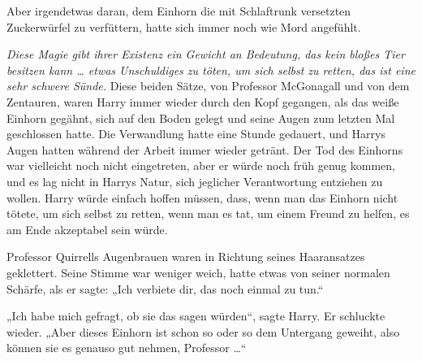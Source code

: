 Aber irgendetwas daran, dem Einhorn die mit Schlaftrunk versetzten Zuckerwürfel zu verfüttern, hatte sich immer noch wie Mord angefühlt.

\emph{Diese Magie gibt ihrer Existenz ein Gewicht an Bedeutung, das kein bloßes Tier besitzen kann … etwas Unschuldiges zu töten, um sich selbst zu retten, das ist eine sehr schwere Sünde.}
Diese beiden Sätze, von Professor McGonagall und von dem Zentauren, waren Harry immer wieder durch den Kopf gegangen, als das weiße Einhorn gegähnt, sich auf den Boden gelegt und seine Augen zum letzten Mal geschlossen hatte. Die Verwandlung hatte eine Stunde gedauert, und Harrys Augen hatten während der Arbeit immer wieder getränt. Der Tod des Einhorns war vielleicht noch nicht eingetreten, aber er würde noch früh genug kommen, und es lag nicht in Harrys Natur, sich jeglicher Verantwortung entziehen zu wollen. Harry würde einfach hoffen müssen, dass, wenn man das Einhorn nicht tötete, um sich selbst zu retten, wenn man es tat, um einem Freund zu helfen, es am Ende akzeptabel sein würde.

Professor Quirrells Augenbrauen waren in Richtung seines Haaransatzes geklettert. Seine Stimme war weniger weich, hatte etwas von seiner normalen Schärfe, als er sagte:
„Ich verbiete dir, das noch einmal zu tun.“

„Ich habe mich gefragt, ob sie das sagen würden“, sagte Harry. Er schluckte wieder.
„Aber dieses Einhorn ist schon so oder so dem Untergang geweiht, also können sie es genauso gut nehmen, Professor …“

